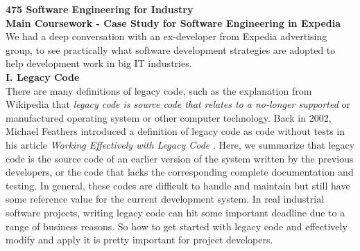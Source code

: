 \documentclass[11pt]{article}
\begin{document}
{\bf 475 Software Engineering for Industry} \\
{\bf Main Coursework - Case Study for Software Engineering in Expedia}\\[10px]
We had a deep conversation with an ex-developer from Expedia advertising group, to see practically what software development strategies are adopted to help development work in big IT industries. \\[10px]
{\bf I. Legacy Code}\\[10px]
There are many definitions of legacy code, such as the explanation from Wikipedia that \textit{legacy code is source code that relates to a no-longer supported} \cite{no1} or manufactured operating system or other computer technology. Back in 2002, Michael Feathers introduced a definition of legacy code as code without tests in his article \textit{Working Effectively with Legacy Code} \cite{no2}. Here, we summarize that legacy code is the source code of an earlier version of the system written by the previous developers, or the code that lacks the corresponding complete documentation and testing. In general, these codes are difficult to handle and maintain but still have some reference value for the current development system. In real industrial software projects, writing legacy code can hit some important deadline due to a range of business reasons. So how to get started with legacy code and effectively modify and apply it is pretty important for project developers.\\[10px]
\end{document}

